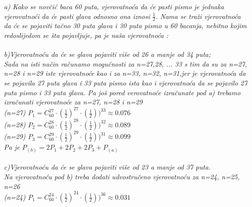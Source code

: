 \documentclass[12pt]{article}
\begin{document}
\begin{enumerate}
		\begin{center}
		\textit{
		a) Kako se novčić baca 60 puta, vjerovatnoća da će pasti pismo je jednaka vjerovatnoći da će pasti glava odnosno ona iznosi $\frac{1}{2}$. Nama se traži vjerovatnoća da će se pojaviti tačno 30 puta glava i 30 puta pismo u 60 bacanja, nebitno kojim redoslijedom se šta pojavljuje, pa je naša vjerovatnoća : \\ \vspace{0.15cm}
		 \\ \vspace{0.25cm}
		b)Vjerovatnoću da će se glava pojaviti više od 26 a manje od 34 puta; \\
Sada na isti način računamo mogućnosti za n=27,28, ... 33 s tim da su za n=27, n=28 i n=29
iste vjerovatnoće kao i za n=33, n=32, n=31,jer je vjerovatnoća da se pojavila 27 puta glava i 33 puta pismo ista kao i vjerovatnoća da se pojavilo 27 puta pismo i 33 puta glava.
Pa još pored verovatnoće izračunate pod a) trebamo izračunati vjerovatnoće za n=27, n=28 i n=29
\\ \vspace{0.25cm}
(n=27) $P_1 =  C^{27}_{60} \cdot (\frac{1}{2})^{27} \cdot (\frac{1}{2}))^{33} \approx 0.076 $
\\ \vspace{0.15cm}
(n=28) $P_2 =  C^{28}_{60} \cdot (\frac{1}{2})^{28} \cdot (\frac{1}{2}))^{32} \approx 0.089 $
\\ \vspace{0.25cm}
(n=29) $P_3 =  C^{29}_{60} \cdot (\frac{1}{2})^{29} \cdot (\frac{1}{2}))^{31} \approx 0.099 $
\\ \vspace{0.25cm}
Pa je $P_{(b)} = 2P_1 + 2P_2 + 2P_3 + P_{(a)}$ \\ \vspace{0.15cm}
\\ \vspace{0.25cm}
c)Vjerovatnoću da će se glava pojaviti više od 23 a manje od 37 puta.\\
Na vjerovatnoću pod b) treba dodati udvostručeno vjerovatnoću za n=24, n=25, n=26 \\
\vspace{0.15cm}
(n=24) $P_1 =  C^{24}_{60} \cdot (\frac{1}{2})^{24} \cdot (\frac{1}{2}))^{36} \approx 0.031 $
\\ \vspace{0.15cm}
}
\end{center}
\end{enumerate}
\end{document}
